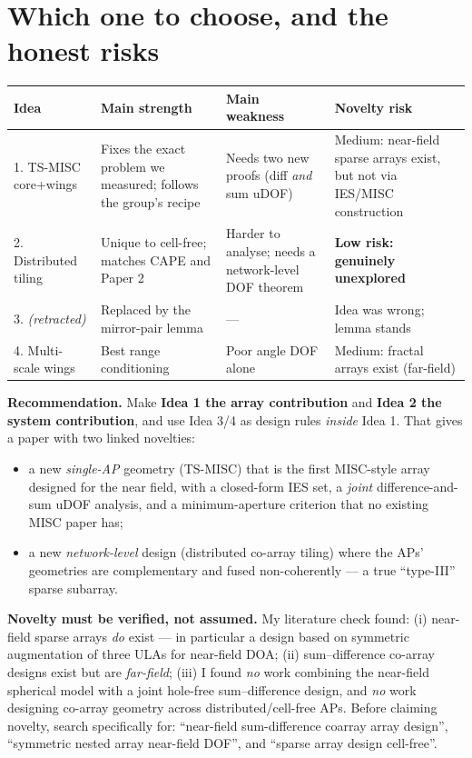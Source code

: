 \documentclass[11pt]{article}
\begin{document}
\section{Which one to choose, and the honest risks}

\begin{center}
\begin{tabular}{@{}p{3.1cm}p{3.4cm}p{3.4cm}p{3.6cm}@{}}
\toprule
\textbf{Idea} & \textbf{Main strength} & \textbf{Main weakness} & \textbf{Novelty risk} \\
\midrule
1. TS-MISC core+wings & Fixes the exact problem we measured; follows the group's recipe & Needs two
new proofs (diff \emph{and} sum uDOF) & Medium: near-field sparse arrays exist, but not via
IES/MISC construction \\
2. Distributed tiling & Unique to cell-free; matches CAPE and Paper 2 & Harder to analyse; needs a
network-level DOF theorem & \textbf{Low risk: genuinely unexplored} \\
3. \emph{(retracted)} & Replaced by the mirror-pair lemma & --- & Idea was wrong; lemma stands \\
4. Multi-scale wings & Best range conditioning & Poor angle DOF alone & Medium: fractal arrays exist
(far-field) \\
\bottomrule
\end{tabular}
\end{center}

\begin{keybox}
\textbf{Recommendation.} Make \textbf{Idea 1 the array contribution} and \textbf{Idea 2 the system
contribution}, and use Idea 3/4 as design rules \emph{inside} Idea 1. That gives a paper with two
linked novelties:
\begin{itemize}
\item a new \emph{single-AP} geometry (TS-MISC) that is the first MISC-style array designed for the
near field, with a closed-form IES set, a \emph{joint} difference-and-sum uDOF analysis, and a
minimum-aperture criterion that no existing MISC paper has;
\item a new \emph{network-level} design (distributed co-array tiling) where the APs' geometries are
complementary and fused non-coherently --- a true ``type-III'' sparse subarray.
\end{itemize}
\end{keybox}

\begin{warnbox}
\textbf{Novelty must be verified, not assumed.} My literature check found: (i) near-field sparse
arrays \emph{do} exist --- in particular a design based on symmetric augmentation of three ULAs for
near-field DOA; (ii) sum--difference co-array designs exist but are \emph{far-field}; (iii) I found
\emph{no} work combining the near-field spherical model with a joint hole-free sum--difference
design, and \emph{no} work designing co-array geometry across distributed/cell-free APs. Before
claiming novelty, search specifically for: ``near-field sum-difference coarray array design'',
``symmetric nested array near-field DOF'', and ``sparse array design cell-free''.
\end{warnbox}
\end{document}
